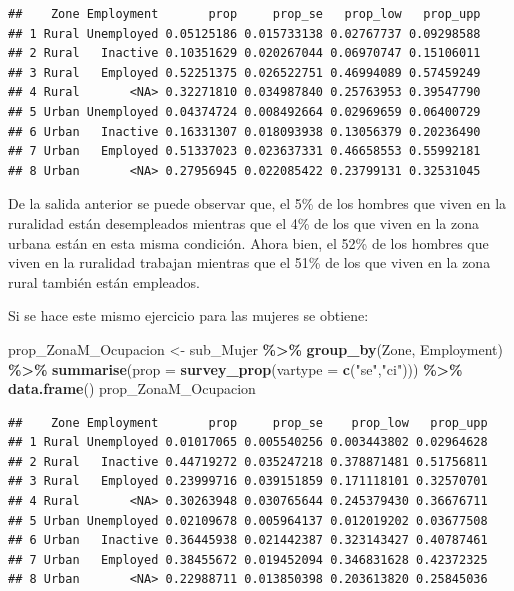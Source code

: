 \documentclass[
  12pt,
]{book}
\newenvironment{Shaded}{\begin{snugshade}}{\end{snugshade}}
\newcommand{\AttributeTok}[1]{\textcolor[rgb]{0.13,0.29,0.53}{#1}}
\newcommand{\FunctionTok}[1]{\textcolor[rgb]{0.13,0.29,0.53}{\textbf{#1}}}
\newcommand{\NormalTok}[1]{#1}
\newcommand{\OtherTok}[1]{\textcolor[rgb]{0.56,0.35,0.01}{#1}}
\newcommand{\SpecialCharTok}[1]{\textcolor[rgb]{0.81,0.36,0.00}{\textbf{#1}}}
\newcommand{\StringTok}[1]{\textcolor[rgb]{0.31,0.60,0.02}{#1}}
\begin{document}
\begin{verbatim}
##    Zone Employment       prop     prop_se   prop_low   prop_upp
## 1 Rural Unemployed 0.05125186 0.015733138 0.02767737 0.09298588
## 2 Rural   Inactive 0.10351629 0.020267044 0.06970747 0.15106011
## 3 Rural   Employed 0.52251375 0.026522751 0.46994089 0.57459249
## 4 Rural       <NA> 0.32271810 0.034987840 0.25763953 0.39547790
## 5 Urban Unemployed 0.04374724 0.008492664 0.02969659 0.06400729
## 6 Urban   Inactive 0.16331307 0.018093938 0.13056379 0.20236490
## 7 Urban   Employed 0.51337023 0.023637331 0.46658553 0.55992181
## 8 Urban       <NA> 0.27956945 0.022085422 0.23799131 0.32531045
\end{verbatim}

De la salida anterior se puede observar que, el 5\% de los hombres que viven en la ruralidad están desempleados mientras que el 4\% de los que viven en la zona urbana están en esta misma condición. Ahora bien, el 52\% de los hombres que viven en la ruralidad trabajan mientras que el 51\% de los que viven en la zona rural también están empleados.

Si se hace este mismo ejercicio para las mujeres se obtiene:

\begin{Shaded}
\begin{Highlighting}[]
\NormalTok{prop\_ZonaM\_Ocupacion }\OtherTok{\textless{}{-}}\NormalTok{ sub\_Mujer }\SpecialCharTok{\%\textgreater{}\%} 
                        \FunctionTok{group\_by}\NormalTok{(Zone, Employment) }\SpecialCharTok{\%\textgreater{}\%} 
                        \FunctionTok{summarise}\NormalTok{(}\AttributeTok{prop =} \FunctionTok{survey\_prop}\NormalTok{(}\AttributeTok{vartype =} \FunctionTok{c}\NormalTok{(}\StringTok{"se"}\NormalTok{,}\StringTok{"ci"}\NormalTok{))) }\SpecialCharTok{\%\textgreater{}\%}
                        \FunctionTok{data.frame}\NormalTok{()}
\NormalTok{prop\_ZonaM\_Ocupacion}
\end{Highlighting}
\end{Shaded}

\begin{verbatim}
##    Zone Employment       prop     prop_se    prop_low   prop_upp
## 1 Rural Unemployed 0.01017065 0.005540256 0.003443802 0.02964628
## 2 Rural   Inactive 0.44719272 0.035247218 0.378871481 0.51756811
## 3 Rural   Employed 0.23999716 0.039151859 0.171118101 0.32570701
## 4 Rural       <NA> 0.30263948 0.030765644 0.245379430 0.36676711
## 5 Urban Unemployed 0.02109678 0.005964137 0.012019202 0.03677508
## 6 Urban   Inactive 0.36445938 0.021442387 0.323143427 0.40787461
## 7 Urban   Employed 0.38455672 0.019452094 0.346831628 0.42372325
## 8 Urban       <NA> 0.22988711 0.013850398 0.203613820 0.25845036
\end{verbatim}
\end{document}
